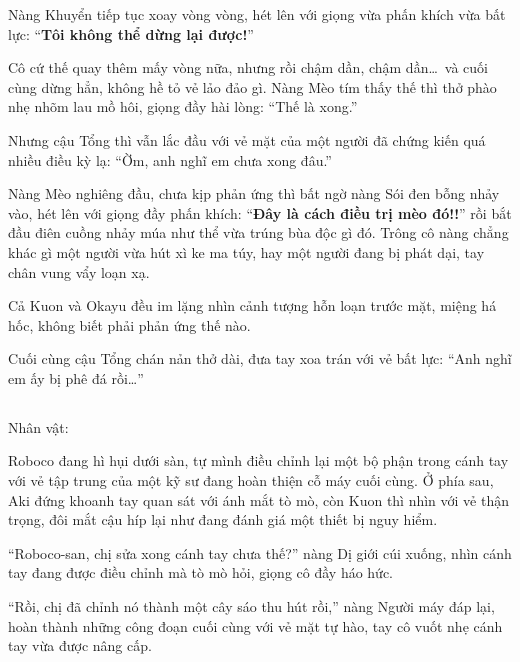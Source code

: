 \documentclass[../main.tex]{subfiles}
\begin{document}
Nàng Khuyển tiếp tục xoay vòng vòng, hét lên với giọng vừa phấn khích vừa bất lực: ``\textbf{Tôi không thể dừng lại được!}''

Cô cứ thế quay thêm mấy vòng nữa, nhưng rồi chậm dần, chậm dần\dots\ và cuối cùng dừng hẳn, không hề tỏ vẻ lảo đảo gì. Nàng Mèo tím thấy thế thì thở phào nhẹ nhõm lau mồ hôi, giọng đầy hài lòng: ``Thế là xong.''

Nhưng cậu Tổng thì vẫn lắc đầu với vẻ mặt của một người đã chứng kiến quá nhiều điều kỳ lạ: ``Ờm, anh nghĩ em chưa xong đâu.''

Nàng Mèo nghiêng đầu, chưa kịp phản ứng thì bất ngờ nàng Sói đen bỗng nhảy vào, hét lên với giọng đầy phấn khích: ``\textbf{Đây là cách điều trị mèo đó!!}'' rồi bắt đầu điên cuồng nhảy múa như thể vừa trúng bùa độc gì đó. Trông cô nàng chẳng khác gì một người vừa hút xì ke ma túy, hay một người đang bị phát dại, tay chân vung vẩy loạn xạ.


Cả Kuon và Okayu đều im lặng nhìn cảnh tượng hỗn loạn trước mặt, miệng há hốc, không biết phải phản ứng thế nào.

Cuối cùng cậu Tổng chán nản thở dài, đưa tay xoa trán với vẻ bất lực: ``Anh nghĩ em ấy bị phê đá rồi\dots''

\newpage

\subsection*{\label{ep-S13.VII}}
\begin{center}
  {\caviar\fontsize{12pt}{12pt}\selectfont Nhân vật:    }
\end{center}

Roboco đang hì hụi dưới sàn, tự mình điều chỉnh lại một bộ phận trong cánh tay với vẻ tập trung của một kỹ sư đang hoàn thiện cỗ máy cuối cùng. Ở phía sau, Aki đứng khoanh tay quan sát với ánh mắt tò mò, còn Kuon thì nhìn với vẻ thận trọng, đôi mắt cậu híp lại như đang đánh giá một thiết bị nguy hiểm.

``Roboco-san, chị sửa xong cánh tay chưa thế?'' nàng Dị giới cúi xuống, nhìn cánh tay đang được điều chỉnh mà tò mò hỏi, giọng cô đầy háo hức.

``Rồi, chị đã chỉnh nó thành một cây sáo thu hút rồi,'' nàng Người máy đáp lại, hoàn thành những công đoạn cuối cùng với vẻ mặt tự hào, tay cô vuốt nhẹ cánh tay vừa được nâng cấp.
\end{document}
